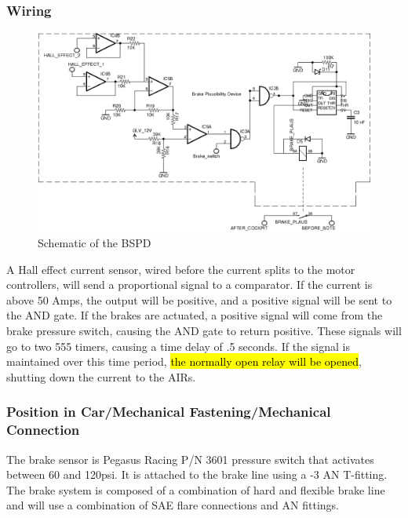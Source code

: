 \documentclass{article}
\DeclareRobustCommand{\hlr}[1]{{\sethlcolor{red}\hl{#1}}}
\begin{document}
        \subsubsection{Wiring}

            \begin{figure}[H]
                \centering
                \includegraphics[width = 0.9 \textwidth]{BSPD}
                \caption{Schematic of the BSPD}
                \label{BSPDschem}
            \end{figure}

A Hall effect current sensor, wired before the current splits to the motor controllers, will send a proportional signal to a comparator. If the current is above 50 Amps, the output will be positive, and a positive signal will be sent to the AND gate. If the brakes are actuated, a positive signal will come from the brake pressure switch, causing the AND gate to return positive. These signals will go to two 555 timers, causing a time delay of .5 seconds. If the signal is maintained over this time period, \hlr{the normally open relay will be opened}, shutting down the current to the AIRs.




        \subsubsection{Position in Car/Mechanical Fastening/Mechanical Connection}
 The brake sensor is Pegasus Racing P/N 3601 pressure switch that activates between 60 and 120psi. It is attached to the brake line using a -3 AN T-fitting. The brake system is composed of a combination of hard and flexible brake line and will use a combination of SAE flare connections and AN fittings.
\end{document}
